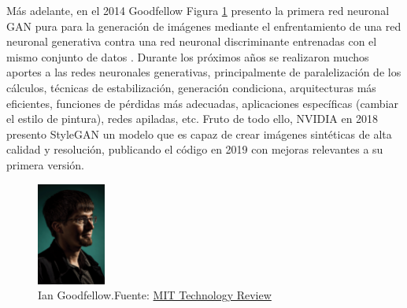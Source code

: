Más adelante, en el 2014 {Goodfellow} Figura \ref{fig:gan-ian-goodfellow} presento la primera red neuronal \gls{GAN} pura para la generación de imágenes mediante el enfrentamiento de una red neuronal generativa contra una red neuronal discriminante entrenadas con el mismo conjunto de datos \cite{goodfellow2014generative}.
Durante los próximos años se realizaron muchos aportes a las redes neuronales generativas, principalmente de paralelización de los cálculos, técnicas de estabilización, generación condiciona, arquitecturas más eficientes, funciones de pérdidas más adecuadas, aplicaciones específicas (cambiar el estilo de pintura), redes apiladas, etc.
Fruto de todo ello, {NVIDIA} en 2018 presento \gls{StyleGAN} \cite{karras2019stylebased} un modelo que es capaz de crear imágenes sintéticas de alta calidad y resolución, publicando el código en 2019 con mejoras relevantes a su primera versión.

\begin{figure}[H]
    \centering
    \includegraphics[width=0.2\textwidth]{figures/gan-goodfellow.png}
    \caption{Ian Goodfellow.\newline{}Fuente: \href{https://www.technologyreview.es/s/10016/el-senor-de-las-gan-el-hombre-que-dio-imaginacion-las-maquinas}{MIT Technology Review}}
    \label{fig:gan-ian-goodfellow}
\end{figure}

